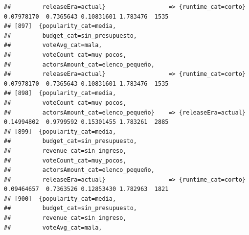 \documentclass[
]{article}
\begin{document}
\begin{verbatim}
##         releaseEra=actual}                  => {runtime_cat=corto}               0.07978170  0.7365643 0.10831601 1.783476  1535
## [897]  {popularity_cat=media,                                                                                                   
##         budget_cat=sin_presupuesto,                                                                                             
##         voteAvg_cat=mala,                                                                                                       
##         voteCount_cat=muy_pocos,                                                                                                
##         actorsAmount_cat=elenco_pequeño,                                                                                        
##         releaseEra=actual}                  => {runtime_cat=corto}               0.07978170  0.7365643 0.10831601 1.783476  1535
## [898]  {popularity_cat=media,                                                                                                   
##         voteCount_cat=muy_pocos,                                                                                                
##         actorsAmount_cat=elenco_pequeño}    => {releaseEra=actual}               0.14994802  0.9799592 0.15301455 1.783261  2885
## [899]  {popularity_cat=media,                                                                                                   
##         budget_cat=sin_presupuesto,                                                                                             
##         revenue_cat=sin_ingreso,                                                                                                
##         voteCount_cat=muy_pocos,                                                                                                
##         actorsAmount_cat=elenco_pequeño,                                                                                        
##         releaseEra=actual}                  => {runtime_cat=corto}               0.09464657  0.7363526 0.12853430 1.782963  1821
## [900]  {popularity_cat=media,                                                                                                   
##         budget_cat=sin_presupuesto,                                                                                             
##         revenue_cat=sin_ingreso,                                                                                                
##         voteAvg_cat=mala,                                                                                                       

\end{verbatim}
\end{document}
